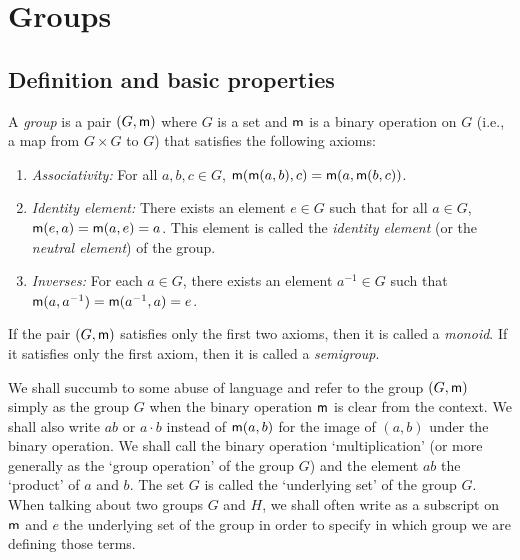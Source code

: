 \chapter{Groups}
\label{ch:groups}

\section{Definition and basic properties}

\begin{definition}
    A \emph{group} is a pair \((G, {\mathsf{m}})\) where \(G\) is a  set and \({\mathsf{m}}\)
    is a binary operation on \(G\) (i.e., a map from \(G \times G\) to \(G\))
    that satisfies the following axioms:
    \begin{enumerate}
        \item \emph{Associativity:} For all \(a, b, c \in G\), \({\mathsf{m}}({\mathsf{m}}(a,
        b), c) = {\mathsf{m}}(a, {\mathsf{m}}(b, c))\).
        \item \emph{Identity element:} There exists an element \(e \in G\) such
        that for all \(a \in G\), \({\mathsf{m}}(e, a) = {\mathsf{m}}(a, e) = a\). This
        element is called the \emph{identity element} (or the \emph{neutral
        element}) of the group.
        \item \emph{Inverses:} For each \(a \in G\), there exists an element
        \(a^{-1} \in G\) such that \({\mathsf{m}}(a, a^{-1}) = {\mathsf{m}}(a^{-1}, a) = e\).
    \end{enumerate}
\end{definition}

If the pair \((G, {\mathsf{m}})\) satisfies only the first two axioms, then it is
called a \emph{monoid}. If it satisfies only the first axiom, then it is called
a \emph{semigroup}.

We shall succumb to some abuse of language and refer to the group \((G, {\mathsf{m}})\)
simply as the group \(G\) when the binary operation \({\mathsf{m}}\) is clear from the
context. We shall also write \(ab\) or \(a \cdot b\) instead of \({\mathsf{m}}(a, b)\)
for the image of \((a, b)\) under the binary operation. We shall call the binary
operation `multiplication' (or more generally as the `group operation' of the
group \(G\)) and the element \(ab\) the `product' of \(a\) and \(b\). The set
\(G\) is called the `underlying set' of the group \(G\). When talking about two
groups \(G\) and \(H\), we shall often write as a subscript on \({\mathsf{m}}\) and
\(e\) the underlying set of the group in order to specify in which group we are
defining those terms.

